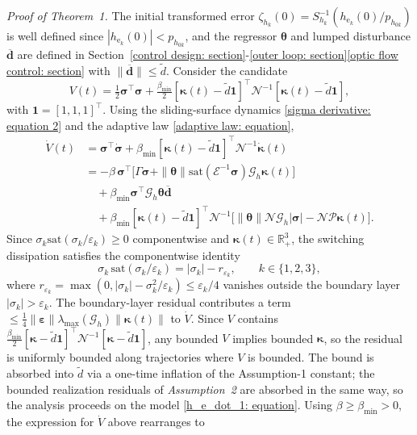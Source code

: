 \documentclass{IEEEtaes}
\begin{document}
\textit{Proof of Theorem~1.} The initial transformed error $\zeta_{h_k}(0) = S_{h_k}^{-1}(h_{\text{e}_k}(0)/p_{h_{0k}})$ is well defined since $|h_{\text{e}_k}(0)|<p_{h_{0k}}$, and the regressor $\boldsymbol{\theta}$ and lumped disturbance $\boldsymbol{\overline{d}}$ are defined in Section~\ref{control design: section}-\ref{outer loop: section}\ref{optic flow control: section} with $\|\boldsymbol{\overline{d}}\|\le\tilde{d}$. Consider the candidate
\begin{equation} \label{V candidate: equation}
    V(t) = \tfrac12\boldsymbol{\sigma}^\top\boldsymbol{\sigma} + \tfrac{\beta_{\min}}{2}[\boldsymbol{\kappa}(t)-\tilde{d}\boldsymbol{1}]^\top\mathcal{N}^{-1}[\boldsymbol{\kappa}(t)-\tilde{d}\boldsymbol{1}],
\end{equation}
with $\boldsymbol{1}=[1,1,1]^\top$. Using the sliding-surface dynamics \eqref{sigma derivative: equation 2} and the adaptive law \eqref{adaptive law: equation},
\begin{align*}
\dot{V}(t) &= \boldsymbol{\sigma}^\top\dot{\boldsymbol{\sigma}} + \beta_{\min}[\boldsymbol{\kappa}(t)-\tilde{d}\boldsymbol{1}]^\top\mathcal{N}^{-1}\dot{\boldsymbol{\kappa}}(t)\\
&= -\beta\,\boldsymbol{\sigma}^\top\!\big[\Gamma\boldsymbol{\sigma}+\|\boldsymbol{\theta}\|\text{sat}(\mathcal{E}^{-1}\boldsymbol{\sigma})\mathcal{G}_h\boldsymbol{\kappa}(t)\big]\\
&\quad + \beta_{\min}\boldsymbol{\sigma}^\top\mathcal{G}_h\boldsymbol{\theta}\boldsymbol{\overline{d}}\\
&\quad + \beta_{\min}[\boldsymbol{\kappa}(t)-\tilde{d}\boldsymbol{1}]^\top\mathcal{N}^{-1}\!\big[\|\boldsymbol{\theta}\|\mathcal{N}\mathcal{G}_h|\boldsymbol{\sigma}| - \mathcal{N}\mathcal{P}\boldsymbol{\kappa}(t)\big].
\end{align*}
Since $\sigma_k\text{sat}(\sigma_k/\varepsilon_k)\ge 0$ componentwise and $\boldsymbol{\kappa}(t)\in\mathbb{R}_+^3$, the switching dissipation satisfies the componentwise identity
\begin{equation*}
\sigma_k\,\text{sat}(\sigma_k/\varepsilon_k) = |\sigma_k| - r_{\varepsilon_k},\qquad k\in\{1,2,3\},
\end{equation*}
where $r_{\varepsilon_k} = \max(0,|\sigma_k|-\sigma_k^2/\varepsilon_k)\le\varepsilon_k/4$ vanishes outside the boundary layer $|\sigma_k|>\varepsilon_k$. The boundary-layer residual contributes a term $\le\tfrac14\|\boldsymbol{\varepsilon}\|\lambda_{\max}(\mathcal{G}_h)\|\boldsymbol{\kappa}(t)\|$ to $\dot V$. Since $V$ contains $\tfrac{\beta_{\min}}{2}[\boldsymbol{\kappa}-\tilde d\boldsymbol{1}]^\top\mathcal{N}^{-1}[\boldsymbol{\kappa}-\tilde d\boldsymbol{1}]$, any bounded $V$ implies bounded $\boldsymbol{\kappa}$, so the residual is uniformly bounded along trajectories where $V$ is bounded. The bound is absorbed into $\tilde{d}$ via a one-time inflation of the Assumption-1 constant; the bounded realization residuals of \textit{Assumption~2} are absorbed in the same way, so the analysis proceeds on the model \eqref{h_e_dot_1: equation}. Using $\beta\ge\beta_{\min}>0$, the expression for $\dot{V}$ above rearranges to
\end{document}
